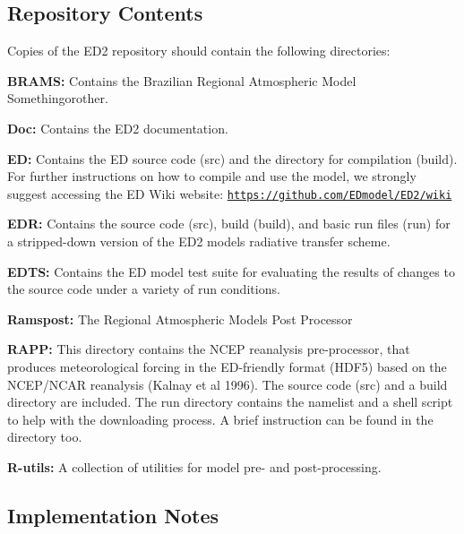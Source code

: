 \subsection*{\label{_contents}%
 Repository Contents }

Copies of the E\+D2 repository should contain the following directories\+:
\begin{DoxyItemize}
\item {\bfseries  B\+R\+A\+MS\+: } Contains the Brazilian Regional Atmospheric Model Somethingorother.
\item {\bfseries  Doc\+: } Contains the E\+D2 documentation.
\item {\bfseries  ED\+: } Contains the ED source code (src) and the directory for compilation (build). For further instructions on how to compile and use the model, we strongly suggest accessing the ED Wiki website\+: \href{https://github.com/EDmodel/ED2/wiki}{\tt https\+://github.\+com/\+E\+Dmodel/\+E\+D2/wiki}
\item {\bfseries  E\+DR\+: } Contains the source code (src), build (build), and basic run files (run) for a stripped-\/down version of the E\+D2 models radiative transfer scheme.
\item {\bfseries  E\+D\+TS\+: } Contains the ED model test suite for evaluating the results of changes to the source code under a variety of run conditions.
\item {\bfseries  Ramspost\+: } The Regional Atmospheric Model\textquotesingle{}s Post Processor
\item {\bfseries  R\+A\+PP\+: } This directory contains the N\+C\+EP reanalysis pre-\/processor, that produces meteorological forcing in the E\+D-\/friendly format (H\+D\+F5) based on the N\+C\+E\+P/\+N\+C\+AR reanalysis (Kalnay et al 1996). The source code (src) and a build directory are included. The run directory contains the namelist and a shell script to help with the downloading process. A brief instruction can be found in the directory too.
\item {\bfseries  R-\/utils\+: } A collection of utilities for model pre-\/ and post-\/processing.
\end{DoxyItemize}

\subsection*{\label{_implementation}%
 Implementation Notes }

